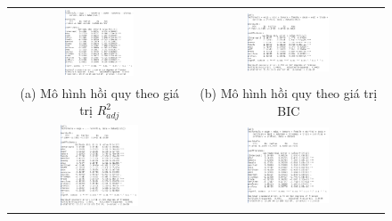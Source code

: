\begin{figure}[H]
	\begin{tabular}{cc}
		\centering
		\includegraphics[width=0.4\textwidth]{../Photo Of Result/model-R-4} &   \includegraphics[width=0.45\textwidth]{../Photo Of Result/model-BIC-4} \\
		(a) Mô hình hồi quy theo giá trị $R^2_{adj}$  & (b) Mô hình hồi quy theo giá trị BIC \\[6pt]
		\includegraphics[width=0.45\textwidth]{../Photo Of Result/model-Cp-4} &   \includegraphics[width=0.45\textwidth]{../Photo Of Result/model-stepwise-aic-4} \\

\end{tabular}
\end{figure}
